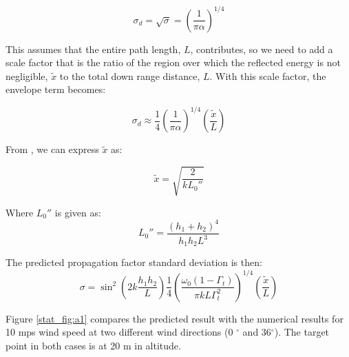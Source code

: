 \begin{equation}
\sigma_d = \sqrt{\sigma} = \left( \frac{1}{\pi\alpha} \right)^{1/4}
\end{equation}
\renewcommand{\baselinestretch}{2} \small\normalsize

This assumes that the entire path length, $L$, contributes, so we need to add a scale factor that is the ratio of the region over which the reflected energy is not negligible, $\tilde{x}$ to the total down range distance, $L$. With this scale factor, the envelope term becomes:

\begin{equation}
\sigma_d \approx \frac{1}{4} \left(\frac{1}{\pi \alpha}\right)^{1/4}\left(\frac{\tilde{x}}{L}\right)
\end{equation}
\renewcommand{\baselinestretch}{2} \small\normalsize

\noindent From \cite{frazier_green}, we can express $\tilde{x}$ as:

\begin{equation}
\tilde{x} = \sqrt{\frac{2}{kL_0''}}
\end{equation}
\renewcommand{\baselinestretch}{2} \small\normalsize

\noindent Where $L_0''$ is given as:
\begin{equation}
L_0''=\frac{(h_1+h_2)^4}{h_1h_2L^3} 
\end{equation}
\renewcommand{\baselinestretch}{2} \small\normalsize

\noindent The predicted propagation factor standard deviation is then:
\begin{equation}
\sigma = \sin^2\left(2k\frac{h_1h_2}{L}\right) \frac{1}{4}\left(\frac{\omega_0(1-\Gamma_t)}{\pi kL\Gamma_t^2}\right)^{1/4}\left(\frac{\tilde{x}}{L}\right)
\label{stat_eq:zzz}
\end{equation}
\renewcommand{\baselinestretch}{2} \small\normalsize

Figure \ref{stat_fig:a1} compares the predicted result with the numerical results for 10 mps wind speed at two different wind directions (0 $^{\circ}$ and 36$^{\circ}$). The target point in both cases is at 20 m in altitude.

